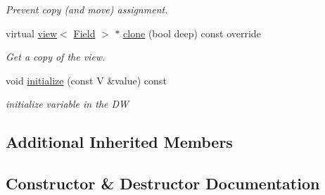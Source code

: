 \begin{DoxyCompactItemize}
\begin{DoxyCompactList}\small\item\em Prevent copy (and move) assignment. \end{DoxyCompactList}\item 
virtual \hyperlink{classUintah_1_1PhaseField_1_1detail_1_1view}{view}$<$ \hyperlink{structUintah_1_1PhaseField_1_1VectorField}{Field} $>$ $\ast$ \hyperlink{classUintah_1_1PhaseField_1_1detail_1_1dw__view_3_01VectorField_3_01T_00_01N_01_4_00_01VAR_00_01DIM_00_01GN_01_4_a3a7ade62eafad8e8db6d6072fb4ad38b}{clone} (bool deep) const override
\begin{DoxyCompactList}\small\item\em Get a copy of the view. \end{DoxyCompactList}\item 
void \hyperlink{classUintah_1_1PhaseField_1_1detail_1_1dw__view_3_01VectorField_3_01T_00_01N_01_4_00_01VAR_00_01DIM_00_01GN_01_4_a4610dc8d6dda1c6b8b66863d854ca7bd}{initialize} (const V \&value) const
\begin{DoxyCompactList}\small\item\em initialize variable in the DW \end{DoxyCompactList}\end{DoxyCompactItemize}
\subsection*{Additional Inherited Members}


\subsection{Constructor \& Destructor Documentation}
\mbox{\label{classUintah_1_1PhaseField_1_1detail_1_1dw__view_3_01VectorField_3_01T_00_01N_01_4_00_01VAR_00_01DIM_00_01GN_01_4_aecbe0f3de7d15c38a27a499064780365}} 
